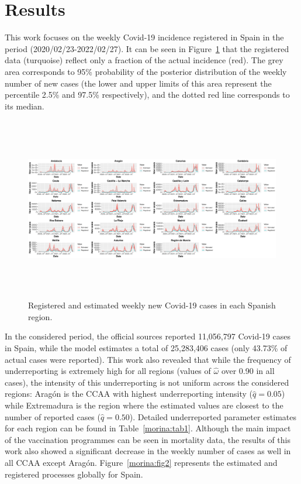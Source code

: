 \documentclass[twoside]{report}
\begin{document}
\section{Results}

This work focuses on the weekly Covid-19 incidence registered in Spain in the period (2020/02/23-2022/02/27). It can be seen in Figure~\ref{morina:fig1} that the registered data (turquoise) reflect only a fraction of the actual incidence (red). The grey area corresponds to 95\% probability of the posterior distribution of the weekly number of new cases (the lower and upper limits of this area represent the percentile 2.5\% and 97.5\% respectively), and the dotted red line corresponds to its median.

\begin{figure}[!ht]\centering
\includegraphics[height=8cm, width=13cm]{morinafig1}
\caption{\label{morina:fig1} Registered and estimated weekly new Covid-19 cases in each Spanish region.}
\end{figure}

In the considered period, the official sources reported 11,056,797 Covid-19 cases in Spain, while the model estimates a total of 25,283,406 cases (only 43.73\% of actual cases were reported). This work also revealed that while the frequency of underreporting is extremely high for all regions (values of $\hat{\omega}$ over 0.90 in all cases), the intensity of this underreporting is not uniform across the considered regions: Arag\'on is the CCAA with highest underreporting intensity ($\hat{q}=0.05$) while Extremadura is the region where the estimated values are closest to the number of reported cases ($\hat{q}=0.50$). Detailed underreported parameter estimates for each region can be found in Table~\ref{morina:tab1}. Although the main impact of the vaccination programmes can be seen in mortality data, the results of this work also showed a significant decrease in the weekly number of cases as well in all CCAA except Arag\'on. Figure~\ref{morina:fig2} represents the estimated and registered processes globally for Spain.
\end{document}
